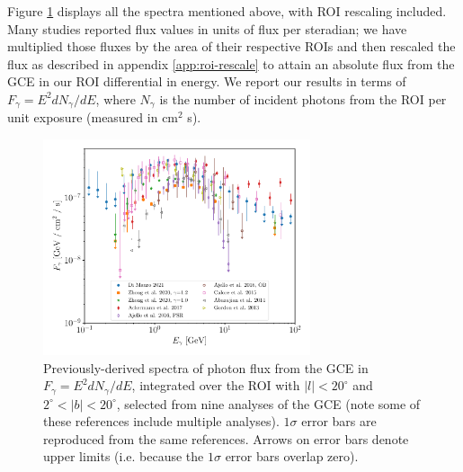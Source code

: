 \documentclass[letter,11pt]{article}
\begin{document}
Figure \ref{fig:all-spectra} displays all the spectra mentioned above, with ROI rescaling included. Many studies reported flux values in units of flux per steradian; we have multiplied those fluxes by the area of their respective ROIs and then rescaled the flux as described in appendix \ref{app:roi-rescale} to attain an absolute flux from the GCE in our ROI differential in energy. We report our results in terms of $F_\gamma = E^2 dN_\gamma/dE$, where $N_\gamma$ is the number of incident photons from the ROI per unit exposure (measured in cm$^2$ s).

\begin{figure}
    \centering
    \includegraphics[width=0.7\textwidth]{figs/all-spectra.pdf}
    \caption{Previously-derived spectra of photon flux from the GCE in $F_\gamma = E^2 dN_\gamma/dE$, integrated over the ROI with $|l| < 20^\circ$ and $2^\circ < |b| < 20^\circ$, selected from nine analyses of the GCE \cite{Zhong:2019ycb, Calore:2014xka, DiMauro:2021raz, Abazajian:2014fta, Gordon13, Ajello:2015kwa, Ajello:2017opo} (note some of these references include multiple analyses). $1\sigma$ error bars are reproduced from the same references. Arrows on error bars denote upper limits (i.e. because the $1\sigma$ error bars overlap zero).}
    \label{fig:all-spectra}
\end{figure}
\end{document}
